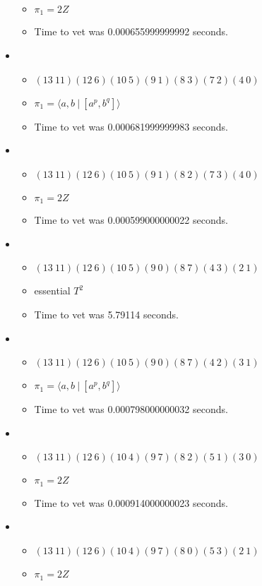 \documentclass{article}
\begin{document}
\begin{itemize}
\begin{itemize}
      \item $\pi_1 =2 Z$
      \item Time to vet was 0.000655999999992 seconds.
\end{itemize}
\item \begin{itemize}
      \item $(13\ 11)(12\ 6)(10\ 5)(9\ 1)(8\ 3)(7\ 2)(4\ 0)$
      \item $\pi_1 = \langle a,b\ |\ [a^p,b^q]\rangle$
      \item Time to vet was 0.000681999999983 seconds.
\end{itemize}
\item \begin{itemize}
      \item $(13\ 11)(12\ 6)(10\ 5)(9\ 1)(8\ 2)(7\ 3)(4\ 0)$
      \item $\pi_1 =2 Z$
      \item Time to vet was 0.000599000000022 seconds.
\end{itemize}
\item \begin{itemize}
      \item $(13\ 11)(12\ 6)(10\ 5)(9\ 0)(8\ 7)(4\ 3)(2\ 1)$
      \item essential $T^2$
      \item Time to vet was 5.79114 seconds.
\end{itemize}
\item \begin{itemize}
      \item $(13\ 11)(12\ 6)(10\ 5)(9\ 0)(8\ 7)(4\ 2)(3\ 1)$
      \item $\pi_1 = \langle a,b\ |\ [a^p,b^q]\rangle$
      \item Time to vet was 0.000798000000032 seconds.
\end{itemize}
\item \begin{itemize}
      \item $(13\ 11)(12\ 6)(10\ 4)(9\ 7)(8\ 2)(5\ 1)(3\ 0)$
      \item $\pi_1 =2 Z$
      \item Time to vet was 0.000914000000023 seconds.
\end{itemize}
\item \begin{itemize}
      \item $(13\ 11)(12\ 6)(10\ 4)(9\ 7)(8\ 0)(5\ 3)(2\ 1)$
      \item $\pi_1 =2 Z$

\end{itemize}
\end{itemize}
\end{document}

